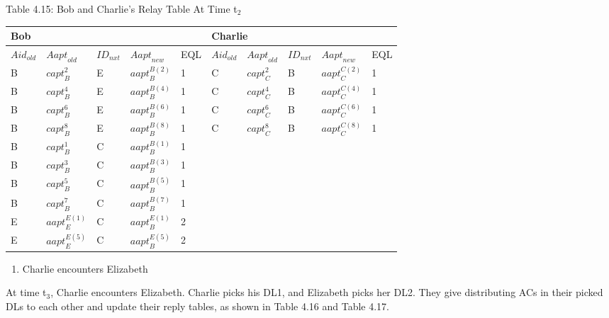 Table 4.15: Bob and Charlie's Relay Table At Time t${}_{2}$

\begin{tabular}{|p{0.4in}|p{0.5in}|p{0.3in}|p{0.5in}|p{0.3in}|p{0.4in}|p{0.4in}|p{0.3in}|p{0.5in}|p{0.3in}|} \hline 
\multicolumn{5}{|p{1in}|}{Bob} & \multicolumn{5}{|p{1.8in}|}{Charlie} \\ \hline 
${Aid}_{old}$ & ${Aapt}_{old}$ & ${ID}_{nxt}$ & ${Aapt}_{new}$ & EQL & ${Aid}_{old}$ & ${Aapt}_{old}$ & ${ID}_{nxt}$ & ${Aapt}_{new}$ & EQL \\ \hline 
B & ${capt}^2_B$ & E & ${aapt}^{B\left(2\right)}_B$ & 1 & C & ${capt}^2_C$ & B & ${aapt}^{C\left(2\right)}_C$ & 1 \\ \hline 
B & ${capt}^4_B$ & E & ${aapt}^{B\left(4\right)}_B$ & 1 & C & ${capt}^4_C$ & B & ${aapt}^{C\left(4\right)}_C$ & 1 \\ \hline 
B & ${capt}^6_B$ & E & ${aapt}^{B\left(6\right)}_B$ & 1 & C & ${capt}^6_C$ & B & ${aapt}^{C\left(6\right)}_C$ & 1 \\ \hline 
B & ${capt}^8_B$ & E & ${aapt}^{B\left(8\right)}_B$ & 1 & C & ${capt}^8_C$ & B & ${aapt}^{C\left(8\right)}_C$ & 1 \\ \hline 
B & ${capt}^1_B$ & C & ${aapt}^{B\left(1\right)}_B$ & 1 &  &  &  &  &  \\ \hline 
B & ${capt}^3_B$ & C & ${aapt}^{B\left(3\right)}_B$ & 1 &  &  &  &  &  \\ \hline 
B & ${capt}^5_B$ & C & ${aapt}^{B\left(5\right)}_B$ & 1 &  &  &  &  &  \\ \hline 
B & ${capt}^7_B$ & C & ${aapt}^{B\left(7\right)}_B$ & 1 &  &  &  &  &  \\ \hline 
E & ${aapt}^{E\left(1\right)}_E$ & C & ${aapt}^{E\left(1\right)}_B$ & 2 &  &  &  &  &  \\ \hline 
E & ${aapt}^{E\left(5\right)}_E$ & C & ${aapt}^{E\left(5\right)}_B$ & 2 &  &  &  &  &  \\ \hline 
\end{tabular}



\noindent 

\noindent 

\begin{enumerate}
\item  Charlie encounters Elizabeth
\end{enumerate}

\noindent At time t${}_{3}$, Charlie encounters Elizabeth. Charlie picks his DL1, and Elizabeth picks her DL2. They give distributing ACs in their picked DLs to each other and update their reply tables, as shown in Table 4.16 and Table 4.17.

